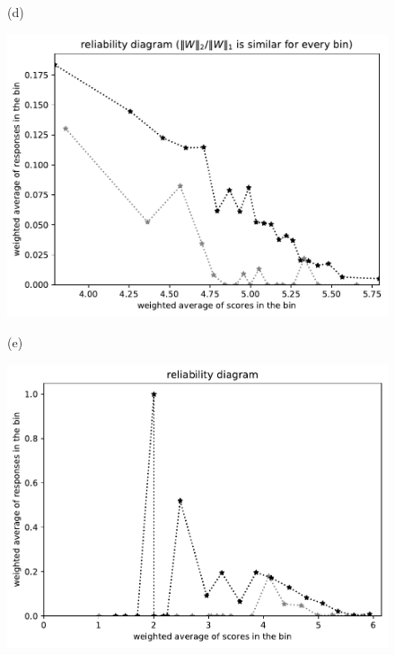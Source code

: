 \documentclass{article}
\newlength{\vertsep}
\newlength{\imsize}
\begin{document}
\begin{figure}
\begin{centering}
(d)
\parbox{\imsize}{\includegraphics[width=\imsize]
{../codes/weighted/County_of_Alameda_vs_Placer-LNGI/equierrs20.pdf}}
\quad\quad
(e)
\parbox{\imsize}{\includegraphics[width=\imsize]
{../codes/weighted/County_of_Alameda_vs_Placer-LNGI/equiscores20.pdf}}

\vspace{\vertsep}


\end{centering}
\end{figure}
\end{document}
